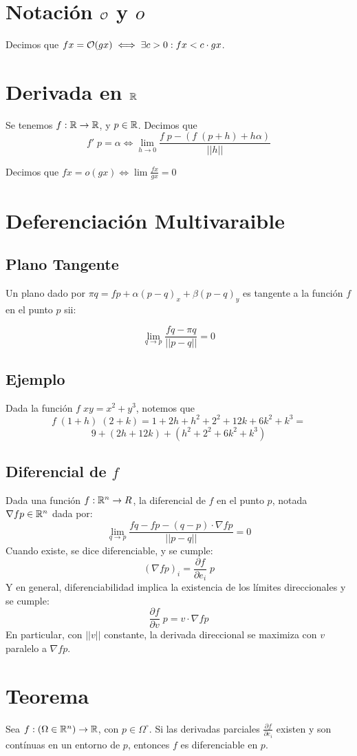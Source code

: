 \documentclass{article}
\begin{document}
\section*{Notación $\mathcal{O}$ y $o$}
Decimos que $f x = \mathcal{O}(g x) \iff \exists c > 0 : fx < c \cdot
gx$.

\section*{Derivada en $\mathbb{R}$}
Se tenemos $f : \mathbb{R} \to \mathbb{R}$, y $p \in \mathbb{R}$. Decimos que
\[f' \; p = \alpha \iff \lim_{h \to 0} \frac{f \; p - (f \; (p + h) + h
\alpha)}{||h||} \]

Decimos que $f x = o(g x) \iff \lim \frac{f x}{g x} = 0$
\section*{Deferenciación Multivaraible}
\subsection*{Plano Tangente}
Un plano dado por $\pi q = fp + \alpha(p-q)_x + \beta(p-q)_y$ es tangente a la
función $f$ en el punto $p$ sii:

\[
	\lim_{q \to p} \frac{fq - \pi q}{||p-q||} = 0
\]

\subsection{Ejemplo}
Dada la función $f \; xy = x^2 + y^3$, notemos que 
\[f \; (1+h) \; (2+k) = 1 + 2h + h^2 + 2^2 + 12k + 6k^2 + k^3 =\]
\[9 + (2h + 12k) + (h^2 + 2^2 + 6k^2 + k^3)\]

\subsection{Diferencial de $f$}
Dada una función $f : \mathbb{R}^n \to R$, la diferencial de $f$ en el punto $p$,
notada $\nabla f p \in \mathbb{R}^n$ dada por:
\[
	\lim_{q \to p} \frac{fq - fp - (q-p) \cdot \nabla f p}{||p-q||} = 0
\]
Cuando existe, se dice diferenciable, y se cumple:
\[(\nabla f p)_i = \frac{\partial f}{\partial e_i} \; p\]
Y en general, diferenciabilidad implica la existencia de los límites
direccionales y se cumple:
\[\frac{\partial f}{\partial v} \; p = v \cdot \nabla f p\]
En particular, con $||v||$ constante, la derivada direccional se maximiza con
$v$ paralelo a $\nabla fp$.

\section*{Teorema}
Sea $f : (\Omega \in \mathbb{R}^n) \to \mathbb{R}$, con $p \in \Omega^\circ$. Si las derivadas
parciales $\frac{\partial f}{\partial e_i} $ existen y son contínuas en un
entorno de $p$, entonces $f$ es diferenciable en $p$.
\end{document}
